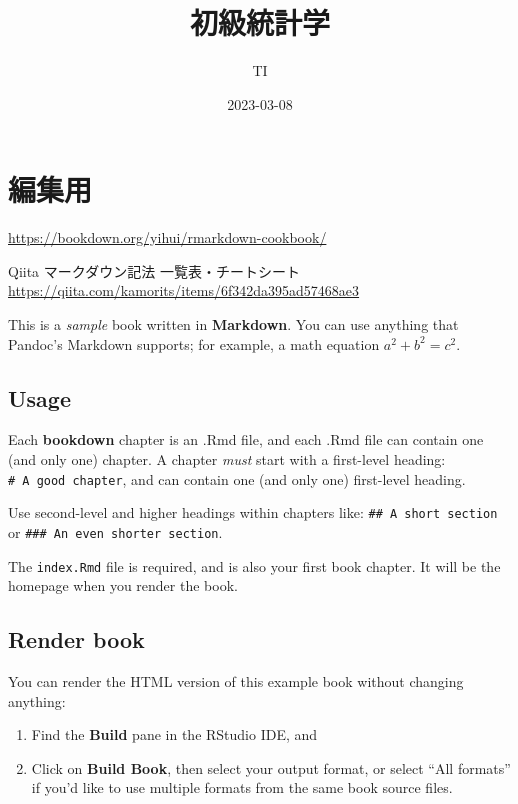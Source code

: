 \documentclass[
]{book}
\title{初級統計学}
\author{TI}
\date{2023-03-08}
\theoremstyle{definition}
\theoremstyle{definition}
\theoremstyle{definition}
\theoremstyle{definition}
\theoremstyle{remark}
\begin{document}
\maketitle

{
\setcounter{tocdepth}{1}
\tableofcontents
}
\hypertarget{ux7de8ux96c6ux7528}{%
\chapter*{編集用}\label{ux7de8ux96c6ux7528}}

\url{https://bookdown.org/yihui/rmarkdown-cookbook/}

Qiita マークダウン記法 一覧表・チートシート
\url{https://qiita.com/kamorits/items/6f342da395ad57468ae3}

This is a \emph{sample} book written in \textbf{Markdown}. You can use anything that Pandoc's Markdown supports; for example, a math equation \(a^2 + b^2 = c^2\).

\hypertarget{usage}{%
\section{Usage}\label{usage}}

Each \textbf{bookdown} chapter is an .Rmd file, and each .Rmd file can contain one (and only one) chapter. A chapter \emph{must} start with a first-level heading: \texttt{\#\ A\ good\ chapter}, and can contain one (and only one) first-level heading.

Use second-level and higher headings within chapters like: \texttt{\#\#\ A\ short\ section} or \texttt{\#\#\#\ An\ even\ shorter\ section}.

The \texttt{index.Rmd} file is required, and is also your first book chapter. It will be the homepage when you render the book.

\hypertarget{render-book}{%
\section{Render book}\label{render-book}}

You can render the HTML version of this example book without changing anything:

\begin{enumerate}
\def\labelenumi{\arabic{enumi}.}
\item
  Find the \textbf{Build} pane in the RStudio IDE, and
\item
  Click on \textbf{Build Book}, then select your output format, or select ``All formats'' if you'd like to use multiple formats from the same book source files.
\end{enumerate}
\end{document}
